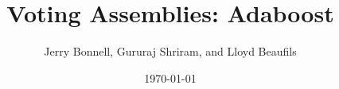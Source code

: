 \documentclass{beamer}
\title[Adaboost]{Voting Assemblies: Adaboost} %
\author{Jerry Bonnell, Gururaj Shriram, and Lloyd Beaufils} %
\institute[ML] {ECE548 Group 7}
\date{\today} %
\begin{document}
{
\begin{frame}
\titlepage %
\end{frame}
}



\end{document}
